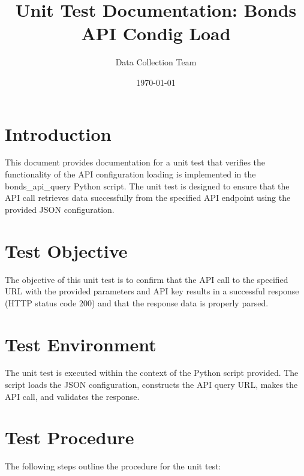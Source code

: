\documentclass{article}
\title{Unit Test Documentation: Bonds API Condig Load}
\author{Data Collection Team}
\date{\today}
\begin{document}
\maketitle


\section{Introduction}\label{sec:introduction}
This document provides documentation for a unit test that verifies the functionality of the API configuration loading is implemented in the bonds\_api\_query Python script.
The unit test is designed to ensure that the API call retrieves data successfully from the specified API endpoint using the provided JSON configuration.

\section{Test Objective}\label{sec:test-objective}
The objective of this unit test is to confirm that the API call to the specified URL with the provided parameters and API key results in a successful response (HTTP status code 200) and that the response data is properly parsed.

\section{Test Environment}\label{sec:test-environment}
The unit test is executed within the context of the Python script provided.
The script loads the JSON configuration, constructs the API query URL, makes the API call, and validates the response.

\section{Test Procedure}\label{sec:test-procedure}
The following steps outline the procedure for the unit test:
\end{document}
